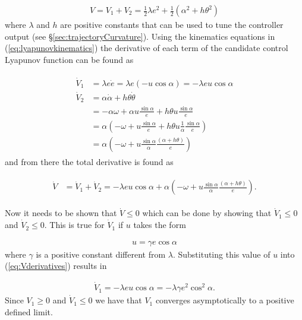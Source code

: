 \begin{align}
\label{eq:lyapunovfunction}
V = V_1 + V_2 = \frac{1}{2}\lambda e^2 + \frac{1}{2}\left(\alpha^2+h\theta^2\right)
\end{align}
where $\lambda$ and $h$ are positive constants that can be used to tune the controller output (see \S\ref{sec:trajectoryCurvature}). Using the kinematics equations in (\ref{eq:lyapunovkinematics}) the derivative of each term of the candidate control Lyapunov function can be found as

\begin{align}
\label{eq:Vderivatives}
\begin{split}
\dot{V}_1 &= \lambda e\dot{e} = \lambda e (-u\cos\alpha) = -\lambda eu\cos\alpha \\
\dot{V}_2 &= \alpha\dot{\alpha}+h\theta\dot{\theta} \\
&= -\alpha\omega + \alpha u\frac{\sin\alpha}{e} + h\theta u\frac{\sin\alpha}{e} \\
&= \alpha\left(-\omega + u\frac{\sin\alpha}{e} + h\theta u\frac{1}{\alpha}\frac{\sin\alpha}{e}\right) \\
&= \alpha\left(-\omega + u\frac{\sin\alpha}{\alpha}\frac{(\alpha+h\theta)}{e}\right)
\end{split}
\end{align}
and from there the total derivative is found as

\begin{align}
\label{eq:lyapunovfunctionderivative}
\begin{split}
\dot{V} &= \dot{V}_1 + \dot{V}_2 = -\lambda e u\cos\alpha + \alpha\left(-\omega+u\frac{\sin\alpha}{\alpha}\frac{(\alpha+h\theta)}{e}\right).
\end{split}
\end{align}

Now it needs to be shown that $\dot{V}\leq0$ which can be done by showing that $\dot{V}_1\leq0$ and $\dot{V}_2\leq0$. This is true for $\dot{V}_1$ if $u$ takes the form

\begin{align}
\label{eq:lyapunovu}
u = \gamma e\cos\alpha
\end{align}
where $\gamma$ is a positive constant different from $\lambda$. Substituting this value of $u$ into (\ref{eq:Vderivatives}) results in

\begin{align}
\label{eq:V1dotfinal}
\dot{V}_1 = -\lambda eu\cos\alpha = -\lambda\gamma e^2\cos^2\alpha.
\end{align}
Since $V_1\geq0$ and $\dot{V}_1\leq0$ we have that $V_1$ converges asymptotically to a positive defined limit.

